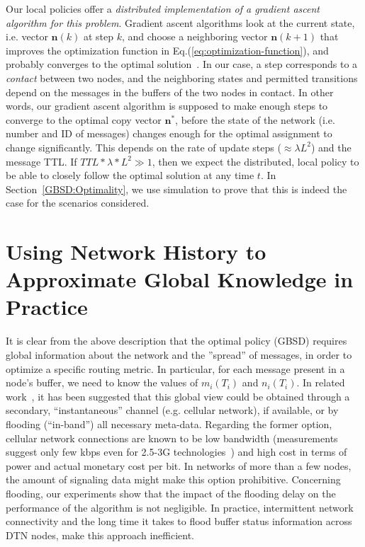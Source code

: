 Our local policies offer a \emph{distributed implementation of a gradient ascent algorithm for this problem}. Gradient ascent algorithms look at the current state, i.e. vector $\mathbf{n}(k)$ at step $k$, and choose a neighboring vector $\mathbf{n}(k+1)$ that improves the optimization function in Eq.(\ref{eq:optimization-function}), and probably converges to the optimal solution~\cite{Boyd:convex-optimization-book}. In our case, a step corresponds to a \emph{contact} between two nodes, and the neighboring states and permitted transitions depend on the messages in the buffers of the two nodes in contact. In other words, our gradient ascent algorithm is supposed to make enough steps to converge to the optimal copy vector $\mathbf{n^{*}}$, before the state of the network (i.e. number and ID of messages) changes enough for the optimal assignment to change significantly. This depends on the rate of update steps ($\approx \lambda L^{2}$) and the message TTL. If $TTL * \lambda * L^{2} \gg 1$, then we expect the distributed, local policy to be able to closely follow the optimal solution at any time $t$. In Section~\ref{GBSD:Optimality}, we use simulation to prove that this is indeed the case for the scenarios considered.

\section{Using Network History to Approximate Global Knowledge in Practice}
\label{sec:learning}

It is clear from the above description that the optimal policy (GBSD) requires global information about the network and the ''spread'' of messages, in order to optimize a specific routing metric. In particular, for each message present in a node's buffer, we need to know the values of $m_i(T_i)$ and $n_i(T_i)$. In related work~\cite{Levine:Sigcomm07}, it has been suggested that this global view could be obtained through a secondary, ``instantaneous'' channel (e.g. cellular network), if available, or by flooding (``in-band'') all necessary meta-data. Regarding the former option, cellular network connections are known to be low bandwidth (measurements suggest only few kbps even for 2.5-3G technologies~\cite{Keshav:multi-nic}) and high cost in terms of power and actual monetary cost per bit. In networks of more than a few nodes, the amount of signaling data might make this option prohibitive. Concerning flooding, our experiments show that the impact of the flooding delay on the performance of the algorithm is not negligible. In practice, intermittent network connectivity and the long time it takes to flood buffer status information across DTN nodes, make this approach inefficient.


